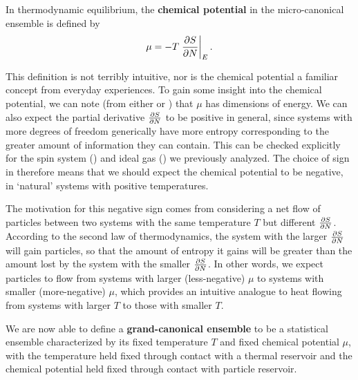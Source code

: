 \begin{shaded}
  In thermodynamic equilibrium, the \textbf{chemical potential} in the micro-canonical ensemble is defined by
  \begin{equation}
    \label{eq:chem_pot}
    \mu = -T \left. \frac{\partial S}{\partial N}\right|_E.
  \end{equation}
\end{shaded}

This definition is not terribly intuitive, nor is the chemical potential a familiar concept from everyday experiences.
To gain some insight into the chemical potential, we can note (from either  or ) that $\mu$ has dimensions of energy.
We can also expect the partial derivative $\frac{\partial S}{\partial N}$ to be positive in general, since systems with more degrees of freedom generically have more entropy corresponding to the greater amount of information they can contain.
This can be checked explicitly for the spin system () and ideal gas () we previously analyzed.
The choice of sign in  therefore means that we should expect the chemical potential to be negative, in `natural' systems with positive temperatures.

The motivation for this negative sign comes from considering a net flow of particles between two systems with the same temperature $T$ but different $\frac{\partial S}{\partial N}$.
According to the second law of thermodynamics, the system with the larger $\frac{\partial S}{\partial N}$ will gain particles, so that the amount of entropy it gains will be greater than the amount lost by the system with the smaller $\frac{\partial S}{\partial N}$.
In other words, we expect particles to flow from systems with larger (less-negative) $\mu$ to systems with smaller (more-negative) $\mu$, which provides an intuitive analogue to heat flowing from systems with larger $T$ to those with smaller $T$.

\begin{shaded}
  We are now able to define a \textbf{grand-canonical ensemble} to be a statistical ensemble characterized by its fixed temperature $T$ and fixed chemical potential $\mu$, with the temperature held fixed through contact with a thermal reservoir and the chemical potential held fixed through contact with particle reservoir.
\end{shaded}



